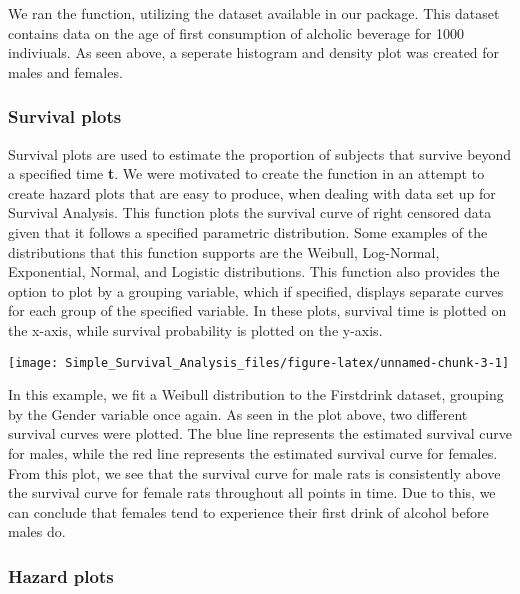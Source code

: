We ran the  function, utilizing the
 dataset available in our package. This dataset
contains data on the age of first consumption of alcholic beverage for
1000 indiviuals. As seen above, a seperate histogram and density plot
was created for males and females.

\hypertarget{survival-plots}{%
\subsubsection{Survival plots}\label{survival-plots}}

Survival plots are used to estimate the proportion of subjects that
survive beyond a specified time \textbf{t}. We were motivated to create
the function  in an attempt to create hazard plots that
are easy to produce, when dealing with data set up for Survival
Analysis. This function plots the survival curve of right censored data
given that it follows a specified parametric distribution. Some examples
of the distributions that this function supports are the Weibull,
Log-Normal, Exponential, Normal, and Logistic distributions. This
function also provides the option to plot by a grouping variable, which
if specified, displays separate curves for each group of the specified
variable. In these plots, survival time is plotted on the x-axis, while
survival probability is plotted on the y-axis.

\begin{Schunk}

\texttt{[image: Simple\_Survival\_Analysis\_files/figure-latex/unnamed-chunk-3-1]} \end{Schunk}

In this example, we fit a Weibull distribution to the Firstdrink
dataset, grouping by the Gender variable once again. As seen in the plot
above, two different survival curves were plotted. The blue line
represents the estimated survival curve for males, while the red line
represents the estimated survival curve for females. From this plot, we
see that the survival curve for male rats is consistently above the
survival curve for female rats throughout all points in time. Due to
this, we can conclude that females tend to experience their first drink
of alcohol before males do.

\hypertarget{hazard-plots}{%
\subsubsection{Hazard plots}\label{hazard-plots}}

